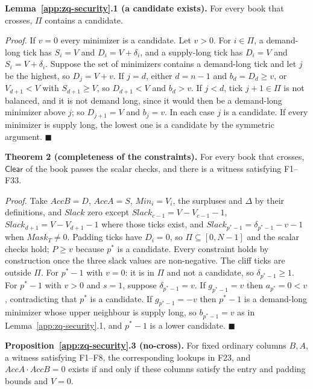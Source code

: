 \textbf{Lemma~\ref{app:zq-security}.1 (a candidate exists).} For every book that crosses, \(\Pi\) contains a candidate.

\emph{Proof.} If \(v = 0\) every minimizer is a candidate. Let \(v > 0\). For \(i \in \Pi\), a demand-long tick has \(S_i = V\) and \(D_i = V + \delta_i\), and a supply-long tick has \(D_i = V\) and \(S_i = V + \delta_i\). Suppose the set of minimizers contains a demand-long tick and let \(j\) be the highest, so \(D_j = V + v\). If \(j = d\), either \(d = n - 1\) and \(b_d = D_d \ge v\), or \(V_{d+1} < V\) with \(S_{d+1} \ge V\), so \(D_{d+1} < V\) and \(b_d > v\). If \(j < d\), tick \(j + 1 \in \Pi\) is not balanced, and it is not demand long, since it would then be a demand-long minimizer above \(j\); so \(D_{j+1} = V\) and \(b_j = v\). In each case \(j\) is a candidate. If every minimizer is supply long, the lowest one is a candidate by the symmetric argument. \(\blacksquare\)

\textbf{Theorem 2 (completeness of the constraints).} For every book that crosses, \(\mathsf{Clear}\) of the book passes the scalar checks, and there is a witness satisfying F1--F33.

\emph{Proof.} Take \(AccB = D\), \(AccA = S\), \(Min_i = V_i\), the surpluses and \(\Delta\) by their definitions, and \(Slack\) zero except \(Slack_{c-1} = V - V_{c-1} - 1\), \(Slack_{d+1} = V - V_{d+1} - 1\) where those ticks exist, and \(Slack_{p^*-1} = \delta_{p^*-1} - v - 1\) when \(Mask_T \ne 0\). Padding ticks have \(D_i = 0\), so \(\Pi \subseteq [0, N-1]\) and the scalar checks hold; \(P \ge v\) because \(p^*\) is a candidate. Every constraint holds by construction once the three slack values are non-negative. The cliff ticks are outside \(\Pi\). For \(p^* - 1\) with \(v = 0\): it is in \(\Pi\) and not a candidate, so \(\delta_{p^*-1} \ge 1\). For \(p^* - 1\) with \(v > 0\) and \(s = 1\), suppose \(\delta_{p^*-1} = v\). If \(g_{p^*-1} = v\) then \(a_{p^*} = 0 < v\), contradicting that \(p^*\) is a candidate. If \(g_{p^*-1} = -v\) then \(p^* - 1\) is a demand-long minimizer whose upper neighbour is supply long, so \(b_{p^*-1} = v\) as in Lemma~\ref{app:zq-security}.1, and \(p^* - 1\) is a lower candidate. \(\blacksquare\)

\textbf{Proposition~\ref{app:zq-security}.3 (no-cross).} For fixed ordinary columns \(B,A\), a witness satisfying F1--F8, the corresponding lookups in F23, and \(AccA \cdot AccB = 0\) exists if and only if these columns satisfy the entry and padding bounds and \(V=0\).

